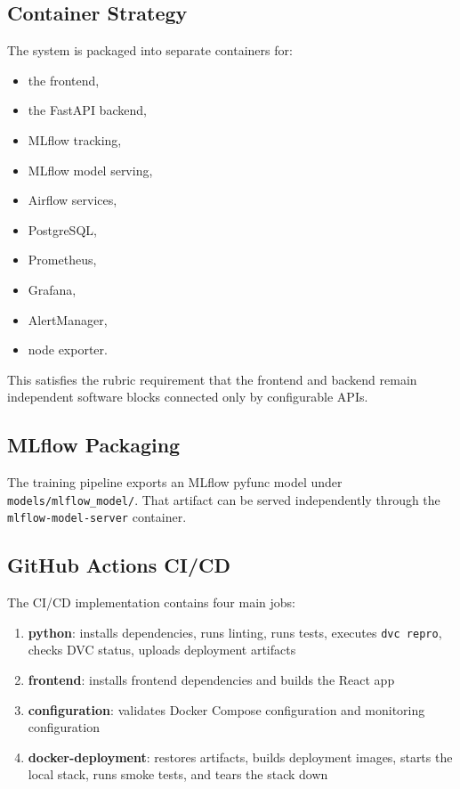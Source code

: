 \documentclass[11pt,a4paper]{article}
\begin{document}
\subsection{Container Strategy}

The system is packaged into separate containers for:

\begin{itemize}[leftmargin=1.4em]
  \item the frontend,
  \item the FastAPI backend,
  \item MLflow tracking,
  \item MLflow model serving,
  \item Airflow services,
  \item PostgreSQL,
  \item Prometheus,
  \item Grafana,
  \item AlertManager,
  \item node exporter.
\end{itemize}

This satisfies the rubric requirement that the frontend and backend remain independent software blocks connected only by configurable APIs.

\subsection{MLflow Packaging}

The training pipeline exports an MLflow pyfunc model under \texttt{models/mlflow\_model/}. That artifact can be served independently through the \texttt{mlflow-model-server} container.

\subsection{GitHub Actions CI/CD}

The CI/CD implementation contains four main jobs:

\begin{enumerate}[leftmargin=1.6em]
  \item \textbf{python}: installs dependencies, runs linting, runs tests, executes \texttt{dvc repro}, checks DVC status, uploads deployment artifacts
  \item \textbf{frontend}: installs frontend dependencies and builds the React app
  \item \textbf{configuration}: validates Docker Compose configuration and monitoring configuration
  \item \textbf{docker-deployment}: restores artifacts, builds deployment images, starts the local stack, runs smoke tests, and tears the stack down
\end{enumerate}
\end{document}
